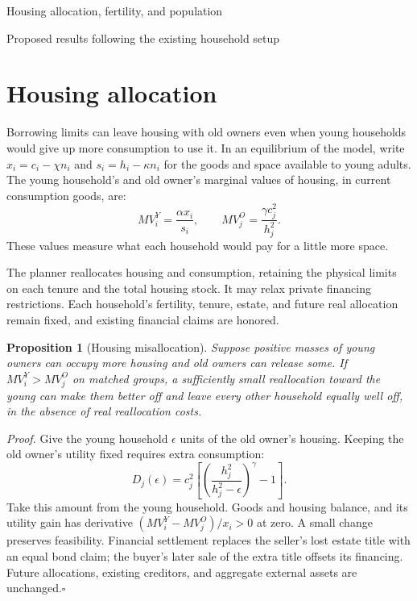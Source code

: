 \documentclass[11pt]{article}
\newtheorem{proposition}{Proposition}
\begin{document}
\begin{center}
{\Large Housing allocation, fertility, and population}\par
\smallskip
{\small Proposed results following the existing household setup}
\end{center}

\section*{Housing allocation}

Borrowing limits can leave housing with old owners even when young households
would give up more consumption to use it. In an equilibrium of the model,
write $x_i=c_i-\chi n_i$ and $s_i=h_i-\kappa n_i$ for
the goods and space available to young adults. The young household's and old
owner's marginal values of housing, in current consumption goods, are:
\begin{equation}
 MV_i^Y=\frac{\alpha x_i}{s_i},\qquad
 MV_j^O=\frac{\gamma c_j^2}{h_j^2}.
 \label{eq:core_values}
\end{equation}
These values measure what each household would pay for a little more space.

The planner reallocates housing and consumption, retaining the physical
limits on each tenure and the total housing stock. It may relax private
financing restrictions. Each household's fertility, tenure, estate, and
future real allocation remain fixed, and existing financial claims are honored.

\begin{proposition}[Housing misallocation]
Suppose positive masses of young owners can occupy more housing and old
owners can release some. If $MV_i^Y>MV_j^O$ on matched groups, a sufficiently
small reallocation toward the young can make them better off and leave
every other household equally well off, in the absence of real reallocation costs.
\end{proposition}

\textit{Proof.} Give the young household $\epsilon$ units of the old owner's
housing. Keeping the old owner's utility fixed requires extra consumption:
\begin{equation}
 D_j(\epsilon)=c_j^2\left[
 \left(\frac{h_j^2}{h_j^2-\epsilon}\right)^\gamma-1\right].
 \label{eq:core_compensation}
\end{equation}
Take this amount from the young household. Goods and housing balance, and
its utility gain has derivative $(MV_i^Y-MV_j^O)/x_i>0$ at zero.
A small change preserves feasibility.
Financial settlement replaces the seller's lost estate title with an equal
bond claim; the buyer's later sale of the extra title offsets its financing.
Future allocations, existing creditors, and aggregate external assets are
unchanged.\hfill$\square$
\end{document}
